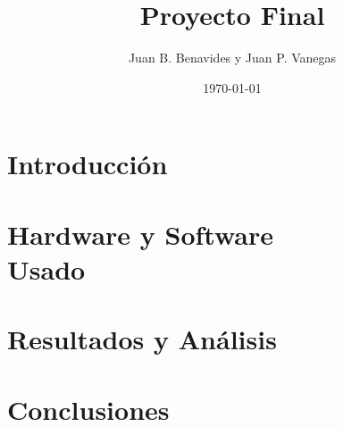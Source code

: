 \documentclass[12pt,twocolumn]{article}
\title{Proyecto Final}
\author{Juan B. Benavides y Juan P. Vanegas }
\date{\today}
\begin{document}
\maketitle

\section{\label{sec: Intro} Introducción}

\section{Hardware y Software \\ Usado}

\section{Resultados y Análisis}

\section{Conclusiones}
\end{document}
